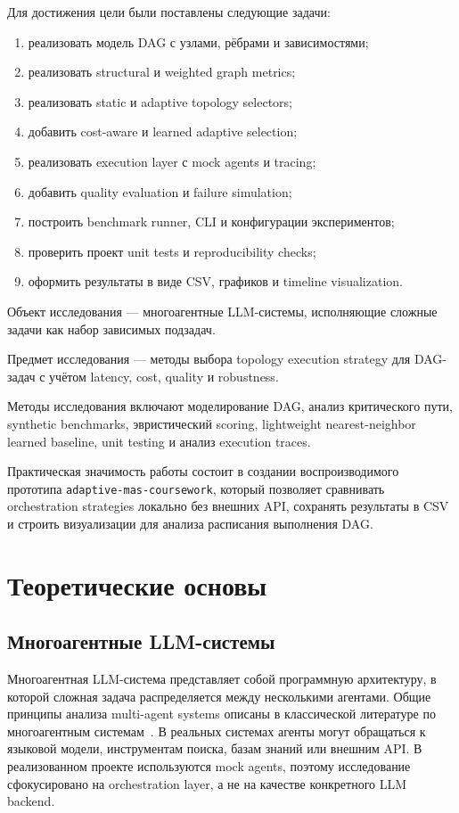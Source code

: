 \documentclass[12pt,a4paper]{report}
\newcommand{\code}[1]{\texttt{#1}}
\newcommand{\project}{\code{adaptive-mas-coursework}}
\begin{document}
Для достижения цели были поставлены следующие задачи:
\begin{enumerate}
  \item реализовать модель DAG с узлами, рёбрами и зависимостями;
  \item реализовать structural и weighted graph metrics;
  \item реализовать static и adaptive topology selectors;
  \item добавить cost-aware и learned adaptive selection;
  \item реализовать execution layer с mock agents и tracing;
  \item добавить quality evaluation и failure simulation;
  \item построить benchmark runner, CLI и конфигурации экспериментов;
  \item проверить проект unit tests и reproducibility checks;
  \item оформить результаты в виде CSV, графиков и timeline visualization.
\end{enumerate}

Объект исследования --- многоагентные LLM-системы, исполняющие сложные задачи как набор зависимых подзадач.

Предмет исследования --- методы выбора topology execution strategy для DAG-задач с учётом latency, cost, quality и robustness.

Методы исследования включают моделирование DAG, анализ критического пути, synthetic benchmarks, эвристический scoring, lightweight nearest-neighbor learned baseline, unit testing и анализ execution traces.

Практическая значимость работы состоит в создании воспроизводимого прототипа \project{}, который позволяет сравнивать orchestration strategies локально без внешних API, сохранять результаты в CSV и строить визуализации для анализа расписания выполнения DAG.

\chapter{Теоретические основы}

\section{Многоагентные LLM-системы}

Многоагентная LLM-система представляет собой программную архитектуру, в которой сложная задача распределяется между несколькими агентами. Общие принципы анализа multi-agent systems описаны в классической литературе по многоагентным системам~\cite{wooldridge2009multiagent}. В реальных системах агенты могут обращаться к языковой модели, инструментам поиска, базам знаний или внешним API. В реализованном проекте используются mock agents, поэтому исследование сфокусировано на orchestration layer, а не на качестве конкретного LLM backend.
\end{document}
